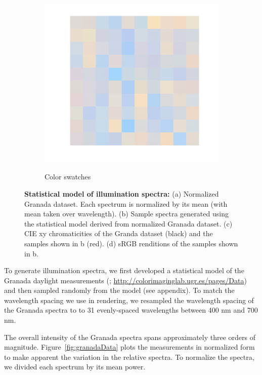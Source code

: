 \documentclass{jov}
\begin{document}
\begin{figure}
\begin{subfigure}[b]{0.24 \textwidth}
        \label{fig:xyDiagram}
        \end{subfigure}
      	\begin{subfigure}[b]{0.24 \textwidth}
    \centering
        \caption{Color swatches}
        \includegraphics[width=\textwidth]{../FiguresDraft5/Figure6/Figure6_d.pdf}
        \label{fig:sRGBIlluminant}
    \end{subfigure}
    \caption{{\bf Statistical model of illumination spectra:} (a) Normalized Granada dataset. Each spectrum is normalized by its mean (with mean taken over wavelength). (b) Sample spectra generated using the statistical model derived from normalized Granada dataset. (c) CIE xy chromaticities of the Granda dataset (black) and the samples shown in b (red). (d) sRGB renditions of the samples shown in b.}
\label{fig:illuminant}
\end{figure}

To generate illumination spectra, we first developed a statistical model of the Granada daylight measurements (; \href{http://colorimaginglab.ugr.es/pages/Data}{http://colorimaginglab.ugr.es/pages/Data}) and then sampled randomly from the model (see appendix).
To match the wavelength spacing we use in rendering, we resampled the wavelength spacing of the Granada spectra to
to 31 evenly-spaced wavelengths between 400 nm and 700 nm.

The overall intensity of the Granada spectra spans approximately three orders of magnitude.
Figure~\ref{fig:granadaData} plots the measurements in normalized form to make apparent the variation in the relative spectra.
To normalize the spectra, we divided each spectrum by its mean power.
\end{document}
